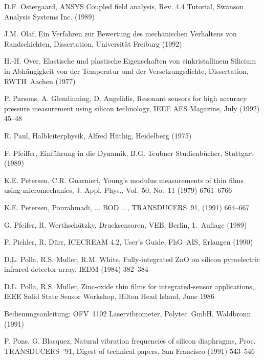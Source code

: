 \begin{thebibliography}{xxx}
 D.F. Ostergaard, {\sf ANSYS} Coupled field analysis, Rev. 4.4 Tutorial,
 Swanson Analysis Systems Inc. (1989)

 J.M. Olaf, Ein Verfahren zur Bewertung des mechanischen Verhaltens von
 Randschichten, Dissertation, Universität Freiburg (1992)

 H.-H. Over, Elastische und plastische Eigenschaften von einkristallinem
 Silicium in Abhängigkeit von der Temperatur und der Versetzungsdichte,
 Dissertation, RWTH~Aachen (1977)

 P. Parsons, A. Glendinning, D. Angelidis, Resonant sensors for high accuracy
 pressure measurement using silicon technology, IEEE AES Magazine,
 July (1992) 45--48

 R. Paul, Halbleiterphysik, Alfred Hüthig, Heidelberg (1975)

  F. Pfeiffer, Einführung in die Dynamik, B.G. Teubner Studienbücher,
  Stuttgart (1989)

 K.E. Petersen, C.R. Guarnieri, Young's modulus measurements of thin films
 using micromechanics, J. Appl. Phys., Vol.~50, No.~11 (1979) 6761--6766

 K.E. Petersen, Pourahmadi, ... BOD ..., TRANSDUCERS~91, (1991) 664--667

 G. Pfeifer, R. Werthschützky, Drucksensoren, VEB, Berlin,
 1.~Auflage (1989)

 P. Pichler, R. Dürr, {\sf ICECREAM} 4.2, User's Guide, FhG--AIS,
 Erlangen (1990)

 D.L. Polla, R.S. Muller, R.M. White, Fully-integrated ZnO on silicon
 pyroelectric infrared detector array, IEDM (1984) 382--384

 D.L. Polla, R.S. Muller, Zinc-oxide thin films for integrated-sensor
 applications, IEEE Solid State Sensor Workshop, Hilton Head Island,
 June 1986

 Bedienungsanleitung: OFV~1102 Laservibrometer, Polytec~GmbH,
 Waldbronn (1991)

 P. Pons, G. Blasquez, Natural vibration frequencies of silicon diaphragms,
 Proc. TRANSDUCERS~'91, Digest of technical papers, San Francisco
 (1991) 543--546


\end{thebibliography}
